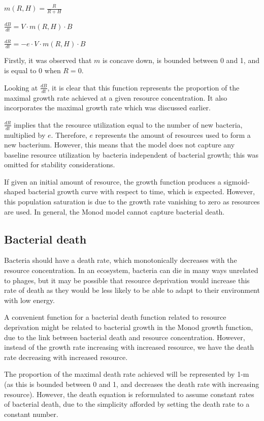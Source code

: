 \documentclass{article}
\begin{document}
\begin{center} $
m(R, H) = \frac{R}{R+H}$

$
\frac{dB}{dt} = V \cdot m(R, H) \cdot B$

$\frac{dR}{dt} = -e \cdot V \cdot m(R, H) \cdot B $
\end{center}

Firstly, it was observed that $m$ is concave down, is bounded between 0 and 1, and is equal to 0 when $R=0$. 

Looking at $\frac{dB}{dt}$, it is clear that this function represents the proportion of the maximal growth rate achieved at a given resource concentration. It also incorporates the maximal growth rate which was discussed earlier. 

 $\frac{dR}{dt}$ implies that the resource utilization equal to the number of new bacteria, multiplied by $e$. Therefore, $e$ represents the amount of resources used to form a new bacterium. However, this means that the model does not capture any baseline resource utilization by bacteria independent of bacterial growth; this was omitted for stability considerations.
 
If given an initial amount of resource, the growth function produces a sigmoid-shaped bacterial growth curve with respect to time, which is expected. However, this population saturation is due to the growth rate vanishing to zero as resources are used. In general, the Monod model cannot capture bacterial death.

\subsection{Bacterial death}
Bacteria should have a death rate, which monotonically decreases with the resource concentration. In an ecosystem, bacteria can die in many ways unrelated to phages, but it may be possible that resource deprivation would increase this rate of death as they would be less likely to be able to adapt to their environment with low energy. 

A convenient function for a bacterial death function related to resource deprivation might be related to bacterial growth in the Monod growth function, due to the link between bacterial death and resource concentration. However, instead of the growth rate increasing with increased resource, we have the death rate decreasing with increased resource.

The proportion of the maximal death rate achieved will be represented by 1-m (as this is bounded between 0 and 1, and decreases the death rate with increasing resource). However, the death equation is reformulated to assume constant rates of bacterial death, due to the simplicity afforded by setting the death rate to a constant number.
\end{document}

